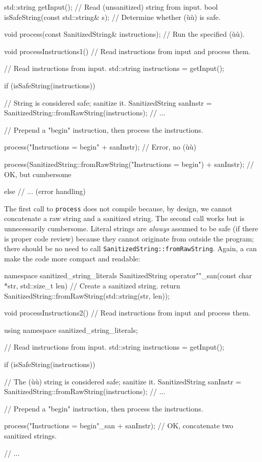 \begin{emcppslisting}[emcppsbatch=e15]
std::string getInput();  // Read (unsanitized) string from input.
bool isSafeString(const std::string& s);  // Determine whether (ù{}ù) is safe.

void process(const SanitizedString& instructions);
    // Run the specified (ù{}ù).

void processInstructions1()
    // Read instructions from input and process them.
{
    // Read instructions from input.
    std::string instructions = getInput();

    if (isSafeString(instructions))
    {
       // String is considered safe; sanitize it.
       SanitizedString sanInstr = SanitizedString::fromRawString(instructions);
       // ...

       // Prepend a "begin" instruction, then process the instructions.

       process("Instructions = begin\n" + sanInstr);
           // Error, no (ù{}ù)

       process(SanitizedString::fromRawString("Instructions = begin\n") +
               sanInstr);
           // OK, but cumbersome
    }
    else
    {
        // ...                  (error handling)
    }
}
\end{emcppslisting}

\noindent The first call to \lstinline!process! does not compile because, by design,
we cannot concatenate a raw string and a sanitized string. The second
call works but is unnecessarily cumbersome. Literal strings are
\emph{always} assumed to be safe (if there is proper code review)
because they cannot originate from outside the program; there should be
no need to call \lstinline!SanitizedString::fromRawString!. Again, a
 can make the code more compact and readable:

\begin{emcppslisting}[emcppsbatch=e15]
namespace sanitized_string_literals
{
    SanitizedString operator""_san(const char *str, std::size_t len)
        // Create a sanitized string.
    {
        return SanitizedString::fromRawString(std::string(str, len));
    }
}

void processInstructions2()
    // Read instructions from input and process them.
{
    using namespace sanitized_string_literals;

    // Read instructions from input.
    std::string instructions = getInput();

    if (isSafeString(instructions))
    {
       // The (ù{}ù) string is considered safe; sanitize it.
       SanitizedString sanInstr = SanitizedString::fromRawString(instructions);
       // ...

       // Prepend a "begin" instruction, then process the instructions.

       process("Instructions = begin\n"_san + sanInstr);
           // OK, concatenate two sanitized strings.
    }
    // ...
}
\end{emcppslisting}

